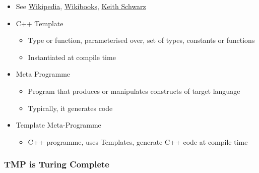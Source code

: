 \begin{itemize}
\itemsep1pt\parskip0pt
\item
  See
  \href{http://en.wikipedia.org/wiki/Template_metaprogramming}{Wikipedia},
  \href{http://en.wikibooks.org/wiki/C\%2B\%2B_Programming/Templates/Template_Meta-Programming}{Wikibooks},
  \href{http://www.keithschwarz.com/talks/slides/tmp-cs242.pdf}{Keith
  Schwarz}
\item
  C++ Template

  \begin{itemize}
  \itemsep1pt\parskip0pt
  \item
    Type or function, parameterised over, set of types, constants or
    functions
  \item
    Instantiated at compile time
  \end{itemize}
\item
  Meta Programme

  \begin{itemize}
  \itemsep1pt\parskip0pt
  \item
    Program that produces or manipulates constructs of target language
  \item
    Typically, it generates code
  \end{itemize}
\item
  Template Meta-Programme

  \begin{itemize}
  \itemsep1pt\parskip0pt
  \item
    C++ programme, uses Templates, generate C++ code at compile time
  \end{itemize}
\end{itemize}

\subsubsection{TMP is Turing Complete}\label{tmp-is-turing-complete}

